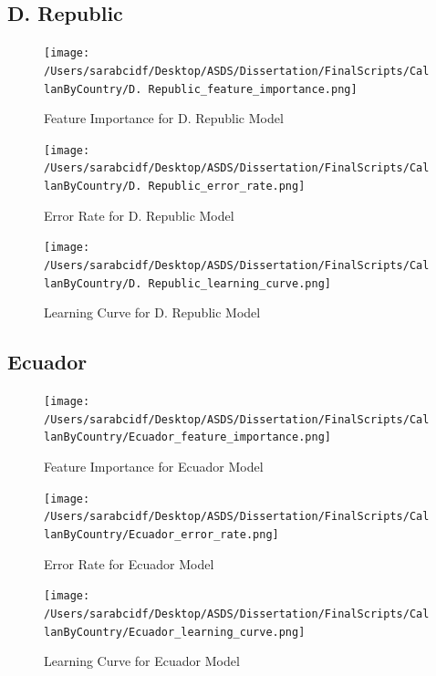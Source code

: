 \documentclass[12pt,letterpaper]{article}
\begin{document}
	\subsection{D. Republic}
	\begin{figure}[H]
		\centering
		\caption{Feature Importance for D. Republic Model}
		\texttt{[image: /Users/sarabcidf/Desktop/ASDS/Dissertation/FinalScripts/CallanByCountry/D.  Republic\_feature\_importance.png]}
	\end{figure}
	\begin{figure}[H]
		\centering
		\caption{Error Rate for D. Republic Model}
		\texttt{[image: /Users/sarabcidf/Desktop/ASDS/Dissertation/FinalScripts/CallanByCountry/D.  Republic\_error\_rate.png]}
	\end{figure}
	\begin{figure}[H]
		\centering
		\caption{Learning Curve for D. Republic Model}
		\texttt{[image: /Users/sarabcidf/Desktop/ASDS/Dissertation/FinalScripts/CallanByCountry/D.  Republic\_learning\_curve.png]}
	\end{figure}
	
	\newpage
	
	\subsection{Ecuador}
	\begin{figure}[H]
		\centering
		\caption{Feature Importance for Ecuador Model}
		\texttt{[image: /Users/sarabcidf/Desktop/ASDS/Dissertation/FinalScripts/CallanByCountry/Ecuador\_feature\_importance.png]}
	\end{figure}
	\begin{figure}[H]
		\centering
		\caption{Error Rate for Ecuador Model}
		\texttt{[image: /Users/sarabcidf/Desktop/ASDS/Dissertation/FinalScripts/CallanByCountry/Ecuador\_error\_rate.png]}
	\end{figure}
	\begin{figure}[H]
		\centering
		\caption{Learning Curve for Ecuador Model}
		\texttt{[image: /Users/sarabcidf/Desktop/ASDS/Dissertation/FinalScripts/CallanByCountry/Ecuador\_learning\_curve.png]}
	\end{figure}
	
	\newpage
	
\end{document}
